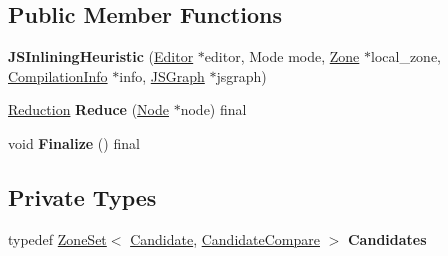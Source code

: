 \subsection*{Public Member Functions}
\begin{DoxyCompactItemize}
\item 
{\bfseries J\+S\+Inlining\+Heuristic} (\hyperlink{classv8_1_1internal_1_1compiler_1_1_advanced_reducer_1_1_editor}{Editor} $\ast$editor, Mode mode, \hyperlink{classv8_1_1internal_1_1_zone}{Zone} $\ast$local\+\_\+zone, \hyperlink{classv8_1_1internal_1_1_compilation_info}{Compilation\+Info} $\ast$info, \hyperlink{classv8_1_1internal_1_1compiler_1_1_j_s_graph}{J\+S\+Graph} $\ast$jsgraph)\hypertarget{classv8_1_1internal_1_1compiler_1_1_j_s_inlining_heuristic_acb45bba55293670e776bb02e4a657038}{}\label{classv8_1_1internal_1_1compiler_1_1_j_s_inlining_heuristic_acb45bba55293670e776bb02e4a657038}

\item 
\hyperlink{classv8_1_1internal_1_1compiler_1_1_reduction}{Reduction} {\bfseries Reduce} (\hyperlink{classv8_1_1internal_1_1compiler_1_1_node}{Node} $\ast$node) final\hypertarget{classv8_1_1internal_1_1compiler_1_1_j_s_inlining_heuristic_a46c67cd61d9ab1b3123e0fecf458e936}{}\label{classv8_1_1internal_1_1compiler_1_1_j_s_inlining_heuristic_a46c67cd61d9ab1b3123e0fecf458e936}

\item 
void {\bfseries Finalize} () final\hypertarget{classv8_1_1internal_1_1compiler_1_1_j_s_inlining_heuristic_aa74c825a3782aa899312b7ea57d74e85}{}\label{classv8_1_1internal_1_1compiler_1_1_j_s_inlining_heuristic_aa74c825a3782aa899312b7ea57d74e85}

\end{DoxyCompactItemize}
\subsection*{Private Types}
\begin{DoxyCompactItemize}
\item 
typedef \hyperlink{classv8_1_1internal_1_1_zone_set}{Zone\+Set}$<$ \hyperlink{structv8_1_1internal_1_1compiler_1_1_j_s_inlining_heuristic_1_1_candidate}{Candidate}, \hyperlink{structv8_1_1internal_1_1compiler_1_1_j_s_inlining_heuristic_1_1_candidate_compare}{Candidate\+Compare} $>$ {\bfseries Candidates}\hypertarget{classv8_1_1internal_1_1compiler_1_1_j_s_inlining_heuristic_a993ae5c3034186a67ae188b906eb51c8}{}\label{classv8_1_1internal_1_1compiler_1_1_j_s_inlining_heuristic_a993ae5c3034186a67ae188b906eb51c8}

\end{DoxyCompactItemize}

